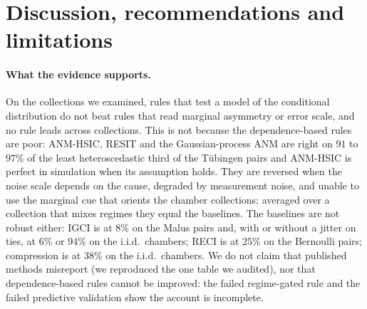 \section{Discussion, recommendations and limitations}\label{sec:discussion}

\paragraph{What the evidence supports.} On the collections we examined, rules that test a model of the conditional distribution do not beat rules that read marginal asymmetry or error scale, and no rule leads across collections. This is not because the dependence-based rules are poor: ANM-HSIC, RESIT and the Gaussian-process ANM are right on $91$ to $97\%$ of the least heteroscedastic third of the T\"ubingen pairs and ANM-HSIC is perfect in simulation when its assumption holds. They are reversed when the noise scale depends on the cause, degraded by measurement noise, and unable to use the marginal cue that orients the chamber collections; averaged over a collection that mixes regimes they equal the baselines. The baselines are not robust either: IGCI is at $8\%$ on the Malus pairs and, with or without a jitter on ties, at $6\%$ or $94\%$ on the i.i.d.\ chambers; RECI is at $25\%$ on the Bernoulli pairs; compression is at $38\%$ on the i.i.d.\ chambers. We do not claim that published methods misreport (we reproduced the one table we audited), nor that dependence-based rules cannot be improved: the failed regime-gated rule and the failed predictive validation show the account is incomplete.

